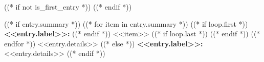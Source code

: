((* if not is_first_entry *))
\vspace{<<design.margins.entry_area.vertical_between>>}
((* endif *))

\begin{onecolentry}
((* if entry.summary *))
    ((* for item in entry.summary *))
    ((* if loop.first *))
    \textbf{<<entry.label>>:}
        ((* endif *))
        <<item>>
        ((* if loop.last *))
        ((* endif *))
    ((* endfor *))
    \description <<entry.details>>
((* else *))
    \textbf{<<entry.label>>:} <<entry.details>>
((* endif *))
\end{onecolentry}
